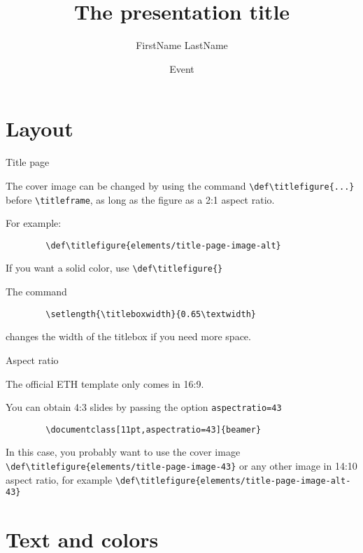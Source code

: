 \documentclass[11pt,aspectratio=169]{beamer}
\title{The presentation title}
\date[June 2025]{Event}
\author{FirstName LastName}
\institute{Machine Learning}
\begin{document}

\titleframe

\tocframe

\section{Layout}

\begin{frame}[fragile]{Title page}

	The cover image can be changed by using the command \verb+\def\titlefigure{...}+ before \verb+\titleframe+, as long as the figure as a 2:1 aspect ratio.
	
	For example:
	\begin{verbatim}
		\def\titlefigure{elements/title-page-image-alt}
	\end{verbatim}
	
	\medskip
	
	If you want a solid color, use \verb+\def\titlefigure{}+
	
	\medskip

	The command	
	\begin{verbatim}
		\setlength{\titleboxwidth}{0.65\textwidth}
	\end{verbatim}
	changes the width of the titlebox if you need more space.

\end{frame}

\begin{frame}[fragile]{Aspect ratio}

	The official ETH template only comes in 16:9.
	
	You can obtain 4:3 slides by passing the option \verb+aspectratio=43+
	\begin{verbatim}
		\documentclass[11pt,aspectratio=43]{beamer}	
	\end{verbatim}
		
	\bigskip
	
	In this case, you probably want to use the cover image \verb+\def\titlefigure{elements/title-page-image-43}+
	or any other image in 14:10 aspect ratio, for example \verb+\def\titlefigure{elements/title-page-image-alt-43}+
	
	
\end{frame}

\section{Text and colors}
\end{document}
